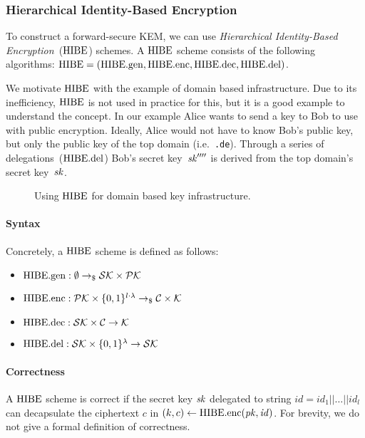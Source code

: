 \subsubsection{Hierarchical Identity-Based Encryption}

To construct a forward-secure KEM, we can use \emph{Hierarchical Identity-Based Encryption}~($\mathrm{HIBE}$) schemes.
A $\mathrm{HIBE}$ scheme consists of the following algorithms: $\mathrm{HIBE} = (\mathrm{HIBE}.\mathrm{gen},\mathrm{HIBE}.\mathrm{enc},\mathrm{HIBE}.\mathrm{dec}, \mathrm{HIBE}.\mathrm{del})$.

We motivate $\mathrm{HIBE}$ with the example of domain based infrastructure.
Due to its inefficiency, $\mathrm{HIBE}$ is not used in practice for this, but it is a good example to understand the concept.
In our example Alice wants to send a key to Bob to use with public encryption.
Ideally, Alice would not have to know Bob's public key, but only the public key of the top domain (i.e.\ \texttt{.de}).
Through a series of delegations~($\mathrm{HIBE}.\mathrm{del}$) Bob's secret key~$\mathit{sk}''''$ is derived from the top domain's secret key~$\mathit{sk}$.

\begin{figure}[!ht]
    \centering
    
    \caption{Using $\mathrm{HIBE}$ for domain based key infrastructure.}
    \label{fig:hibe:example}
\end{figure}

\paragraph{Syntax} Concretely, a $\mathrm{HIBE}$ scheme is defined as follows:
\begin{itemize}
    \item $\mathrm{HIBE}.\mathrm{gen} : \emptyset \to_\$ \mathcal{SK}\times\mathcal{PK}$
    \item $\mathrm{HIBE}.\mathrm{enc}: \mathcal{PK}\times\{0,1\}^{l\cdot\lambda} \to_\$ \mathcal{C}\times\mathcal{K}$
    \item $\mathrm{HIBE}.\mathrm{dec}: \mathcal{SK}\times\mathcal{C} \to \mathcal{K}$
    \item $\mathrm{HIBE}.\mathrm{del}: \mathcal{SK}\times\{0,1\}^\lambda \to \mathcal{SK}$
\end{itemize}

\paragraph{Correctness} A $\mathrm{HIBE}$ scheme is correct if the secret key $\mathit{sk}$ delegated to string $\mathit{id}=\mathit{id}_1||\dots||\mathit{id}_l$ can decapsulate the ciphertext $c$ in $(k,c) \gets \mathrm{HIBE}.\mathrm{enc}(\mathit{pk},\mathit{id})$.
For brevity, we do not give a formal definition of correctness.

